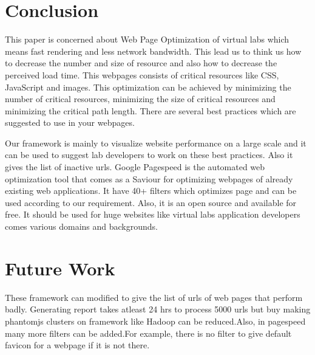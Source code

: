 \documentclass[a4paper,10pt]{IEEEtran}
\begin{document}
\section{Conclusion}
\label{sec-7}
This paper is concerned about Web Page Optimization of virtual labs which means fast rendering and less
network bandwidth. This lead us to think us how to decrease the number and size of
resource and also how to decrease the perceived load time. This webpages consists
of critical resources like CSS, JavaScript and images. This optimization can be
achieved by minimizing the number of critical resources, minimizing the size of
critical resources and minimizing the critical path length. There are several
best practices which are suggested to use in your webpages.

 Our framework is mainly to visualize website performance on a large scale and
it can be used to suggest lab developers to work on these best practices. Also it
gives the list of inactive urls. Google Pagespeed is the automated web optimization
tool that comes as a Saviour for optimizing webpages of already existing web applications. It have 40+
filters which optimizes page and can be used according to our requirement. Also,
it is an open source and available for free. It should be used for huge websites like virtual labs
application developers comes various domains and backgrounds.
 
\section{Future Work}\label{sec-8}
These framework can modified to give the list of urls of web pages that perform badly.
Generating report takes atleast 24 hrs to process 5000 urls but buy
making phantomjs clusters on framework like Hadoop can be reduced.Also, in pagespeed many
more filters can be added.For example, there is no filter to give default
favicon for a webpage if it is not there.
\end{document}
